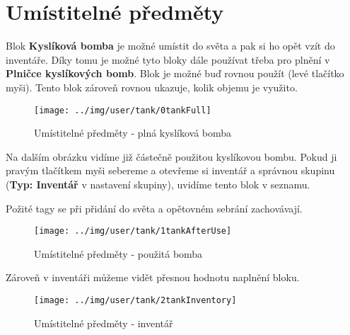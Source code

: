 
\section{Umístitelné předměty}

Blok \textbf{Kyslíková bomba} je možné umístit do světa a pak si ho opět vzít do inventáře. Díky tomu je možné tyto bloky dále používat třeba pro plnění v \textbf{Plničce kyslíkových bomb}.
Blok je možné buď rovnou použít (levé tlačítko myši).
Tento blok zároveň rovnou ukazuje, kolik objemu je využito.

\begin{figure}[!h]\centering
\texttt{[image: ../img/user/tank/0tankFull]}

\caption{Umístitelné předměty - plná kyslíková bomba}
\label{fig:user_tank_0tankFull}

\end{figure}

\FloatBarrier

Na dalším obrázku vidíme již částečně použitou kyslíkovou bombu. Pokud ji pravým tlačítkem myši sebereme a otevřeme si inventář a správnou skupinu (\textbf{Typ: Inventář} v nastavení skupiny), uvidíme tento blok v seznamu.

Požité tagy se při přidání do světa a opětovném sebrání zachovávají.

\begin{figure}[!h]\centering
\texttt{[image: ../img/user/tank/1tankAfterUse]}

\caption{Umístitelné předměty - použitá bomba}
\label{fig:user_tank_1tankAfterUse}

\end{figure}

\FloatBarrier

Zároveň v inventáři můžeme vidět přesnou hodnotu naplnění bloku.

\begin{figure}[!h]\centering
\texttt{[image: ../img/user/tank/2tankInventory]}

\caption{Umístitelné předměty - inventář}
\label{fig:user_tank_2tankInventory}

\end{figure}



\FloatBarrier